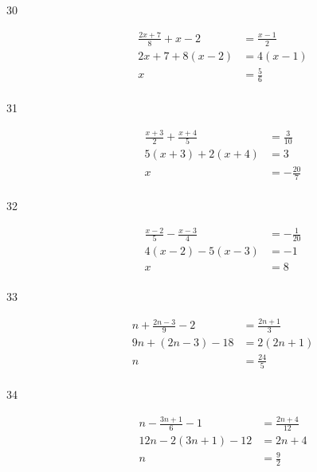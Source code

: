 \documentclass[letterpaper, landscape]{exam}
\begin{document}
\begin{description}
      \item[30]
        \begin{align*}
          \frac{2x + 7}{8} + x - 2 & = \frac{x-1}{2} \\
          2x + 7 + 8(x - 2)        & = 4(x - 1) \\
          x                        & = \boxed{ \frac{5}{6} } \\
        \end{align*}

      \item[31]
        \begin{align*}
          \frac{x + 3}{2} + \frac{x + 4}{5} & = \frac{3}{10} \\
          5(x + 3) + 2(x + 4)               & = 3 \\
          x                                 & = \boxed{ -\frac{20}{7} } \\
        \end{align*}


      \item[32]
        \begin{align*}
          \frac{x - 2}{5} - \frac{x - 3}{4} & = -\frac{1}{20} \\
          4(x - 2) - 5(x - 3)               & = -1 \\
          x                                 & = \boxed{ 8 } \\
        \end{align*}

      \item[33]
        \begin{align*}
          n + \frac{2n - 3}{9} - 2 & = \frac{2n + 1}{3} \\
          9n + (2n - 3) - 18       & = 2 (2n + 1) \\
          n                        & = \boxed{ \frac{24}{5} } \\
        \end{align*}

      \item[34]
        \begin{align*}
          n - \frac{3n + 1}{6} - 1 & = \frac{2n + 4}{12} \\
          12n - 2(3n + 1) - 12     & = 2n + 4 \\
          n                        & = \boxed{ \frac{9}{2} } \\
        \end{align*}


\end{description}
\end{document}
